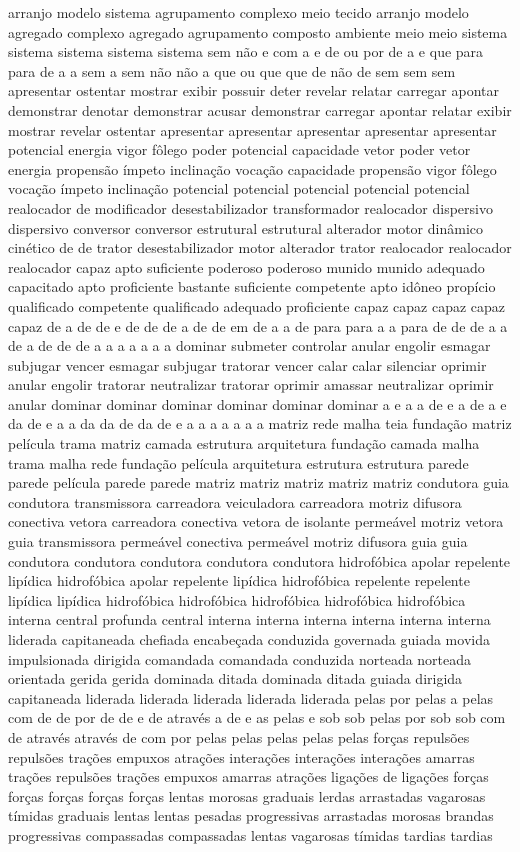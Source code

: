 arranjo modelo sistema agrupamento complexo meio tecido arranjo modelo agregado complexo agregado agrupamento composto ambiente meio meio sistema sistema sistema sistema sistema sem não e com a e de ou por de a e que para para de a a sem a sem não não a que ou que que de não de sem sem sem apresentar ostentar mostrar exibir possuir deter revelar relatar carregar apontar demonstrar denotar demonstrar acusar demonstrar carregar apontar relatar exibir mostrar revelar ostentar apresentar apresentar apresentar apresentar apresentar potencial energia vigor fôlego poder potencial capacidade vetor poder vetor energia propensão ímpeto inclinação vocação capacidade propensão vigor fôlego vocação ímpeto inclinação potencial potencial potencial potencial potencial realocador de modificador desestabilizador transformador realocador dispersivo dispersivo conversor conversor estrutural estrutural alterador motor dinâmico cinético de de trator desestabilizador motor alterador trator realocador realocador realocador capaz apto suficiente poderoso poderoso munido munido adequado capacitado apto proficiente bastante suficiente competente apto idôneo propício qualificado competente qualificado adequado proficiente capaz capaz capaz capaz capaz de a de de e de de de a de de em de a a de para para a a para de de de a a de a de de de a a a a a a a dominar submeter controlar anular engolir esmagar subjugar vencer esmagar subjugar tratorar vencer calar calar silenciar oprimir anular engolir tratorar neutralizar tratorar oprimir amassar neutralizar oprimir anular dominar dominar dominar dominar dominar dominar a e a a de e a de a e da de e a a da da de da de e a a a a a a a matriz rede malha teia fundação matriz película trama matriz camada estrutura arquitetura fundação camada malha trama malha rede fundação película arquitetura estrutura estrutura parede parede película parede parede matriz matriz matriz matriz matriz condutora guia condutora transmissora carreadora veiculadora carreadora motriz difusora conectiva vetora carreadora conectiva vetora de isolante permeável motriz vetora guia transmissora permeável conectiva permeável motriz difusora guia guia condutora condutora condutora condutora condutora hidrofóbica apolar repelente lipídica hidrofóbica apolar repelente lipídica hidrofóbica repelente repelente lipídica lipídica hidrofóbica hidrofóbica hidrofóbica hidrofóbica hidrofóbica interna central profunda central interna interna interna interna interna interna liderada capitaneada chefiada encabeçada conduzida governada guiada movida impulsionada dirigida comandada comandada conduzida norteada norteada orientada gerida gerida dominada ditada dominada ditada guiada dirigida capitaneada liderada liderada liderada liderada liderada pelas por pelas a pelas com de de por de de e de através a de e as pelas e sob sob pelas por sob sob com de através através de com por pelas pelas pelas pelas pelas forças repulsões repulsões trações empuxos atrações interações interações interações amarras trações repulsões trações empuxos amarras atrações ligações de ligações forças forças forças forças forças lentas morosas graduais lerdas arrastadas vagarosas tímidas graduais lentas lentas pesadas progressivas arrastadas morosas brandas progressivas compassadas compassadas lentas vagarosas tímidas tardias tardias 